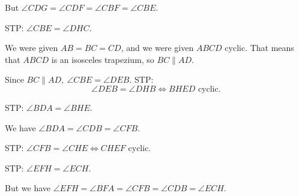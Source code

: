 \documentclass{article}
\begin{document}
\begin{enumerate}[label=G\arabic*.]
    But $\angle CDG=\angle CDF=\angle CBF=\angle CBE$.

    STP: $\angle CBE=\angle DHC$.

    We were given $AB=BC=CD$, and we were given $ABCD$ cyclic. That means that
    $ABCD$ is an isosceles trapezium, so $BC\|AD$.

    Since $BC\|AD,\ \angle CBE=\angle DEB$. STP: \[\angle DEB=\angle DHB\iff
      BHED \text{ cyclic}.\]

    STP: $\angle BDA=\angle BHE.$

    We have $\angle BDA=\angle CDB=\angle CFB$.

    STP: $\angle CFB=\angle CHE\iff CHEF$ cyclic.

    STP: $\angle EFH=\angle ECH$.
    
    But we have $\angle EFH=\angle BFA=\angle CFB=\angle CDB=\angle ECH$.
\end{enumerate}
\end{document}
